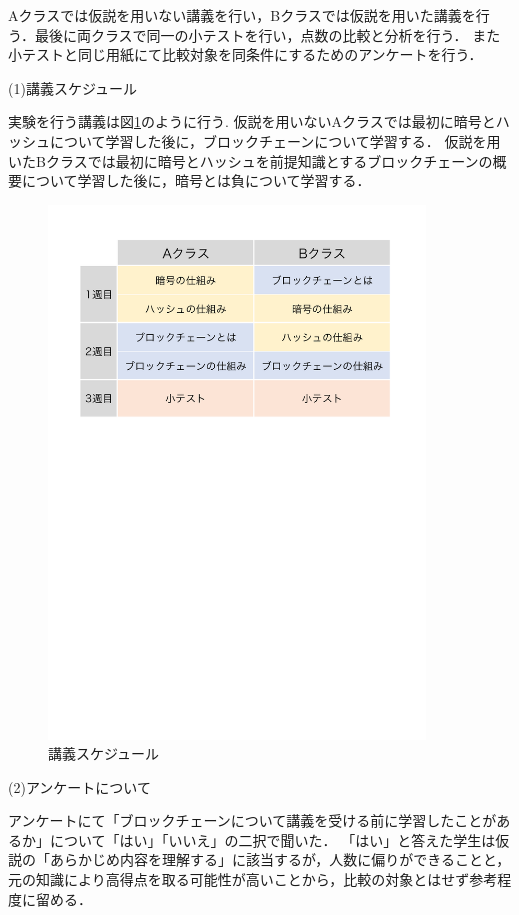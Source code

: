 \documentclass[a4j,12pt]{jsarticle}
\begin{document}
Aクラスでは仮説を用いない講義を行い，Bクラスでは仮説を用いた講義を行う．最後に両クラスで同一の小テストを行い，点数の比較と分析を行う．
また小テストと同じ用紙にて比較対象を同条件にするためのアンケートを行う．

(1)講義スケジュール

実験を行う講義は図\ref{fig:timeline}のように行う.
仮説を用いないAクラスでは最初に暗号とハッシュについて学習した後に，ブロックチェーンについて学習する．
仮説を用いたBクラスでは最初に暗号とハッシュを前提知識とするブロックチェーンの概要について学習した後に，暗号とは負について学習する．

\begin{figure}[H]
\centering
\includegraphics[mediaboxonly=/CropBox,width=10cm]{timeline.pdf}
\caption{講義スケジュール}
\label{fig:timeline}
\end{figure} 

(2)アンケートについて

アンケートにて「ブロックチェーンについて講義を受ける前に学習したことがあるか」について「はい」「いいえ」の二択で聞いた．
「はい」と答えた学生は仮説の「あらかじめ内容を理解する」に該当するが，人数に偏りができることと，元の知識により高得点を取る可能性が高いことから，比較の対象とはせず参考程度に留める．
\end{document}
